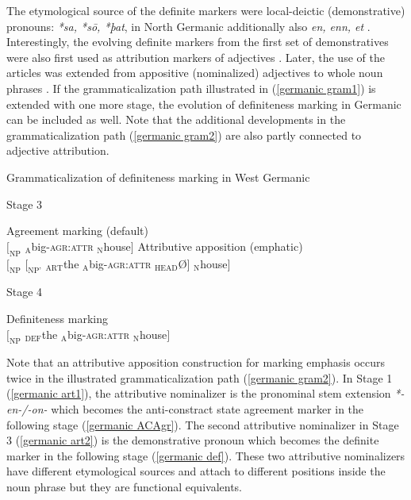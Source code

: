{The etymological source of the definite markers were local-deictic (demonstrative) pronouns:  \textit{*sa, *sō, *þat}, in North Germanic additionally also \textit{en, enn, et} \citep[15]{heinrichs1954}. Interestingly, the evolving definite markers from the first set of  demonstratives were also first used as attribution markers of adjectives \citep{gamillscheg1937, nocentini1996}. Later, the use of the articles was extended from appositive (nominalized) adjectives to whole noun phrases \citep[63]{philippi1997}. If the grammaticalization path illustrated in (\ref{germanic gram1}) is extended with one more stage, the evolution of definiteness marking in Germanic can be included as well. Note that the additional developments in the grammaticalization path (\ref{germanic gram2}) are also partly connected to adjective attribution.
\begin{exe}
\label{germanic gram2}
\ex \rm{Grammaticalization of definiteness marking in West Germanic}
\begin{xlist}
\ex \rm{Stage 3}
\begin{xlist}
\ex \rm{Agreement marking (default)}\\
$[_{\text{NP}}$ $_{\text{A}}$big-\textsc{agr:attr} $_{\text{N}}$house$]$
\ex \rm{Attributive apposition (emphatic)}\\
$[_{\text{NP}}$ $[_{\text{NP'}}$ $_{\text{ART}}$the $_{\text{A}}$big-\textsc{agr:attr} $_{\text{HEAD}}$Ø$]$ $_{\text{N}}$house$]$\label{germanic art2}
\end{xlist}
\ex \rm{Stage 4}
\begin{xlist}
\ex \rm{Definiteness marking}\\
$[_{\text{NP}}$ $_{\text{DEF}}$the $_{\text{A}}$big-\textsc{agr:attr} $_{\text{N}}$house$]$\label{germanic def}
\end{xlist}
\end{xlist}
\end{exe}
Note that an attributive apposition construction for marking emphasis occurs twice in the illustrated grammaticalization path (\ref{germanic gram2}). In Stage 1 (\ref{germanic art1}), the attributive nominalizer is the pronominal stem extension \textit{*-en-/-on-} which becomes the anti-constract state agreement marker in the following stage (\ref{germanic ACAgr}). The second attributive nominalizer in Stage 3 (\ref{germanic art2}) is the demonstrative pronoun which becomes the definite marker in the following stage (\ref{germanic def}). These two attributive nominalizers have different etymological sources and attach to different positions inside the noun phrase but they are functional equivalents.

}
